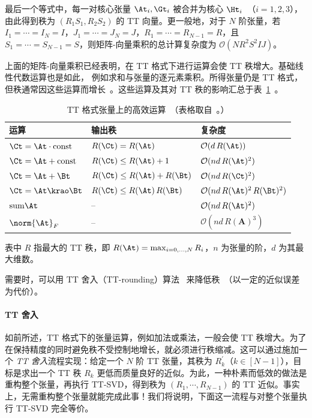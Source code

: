 最后一个等式中，每一对核心张量 $\At_i,\Gt_i$ 被合并为核心 $\Ht_i$~（$i = 1,2,3$），由此得到秩为 $(R_1 S_1, R_2 S_2)$ 的 TT 向量。更一般地，对于 $N$ 阶张量，若 $I_1 = \cdots = I_N = I$，$J_1 = \cdots = J_N = J$，$R_1 = \cdots = R_{N-1} = R$，且 $S_1 = \cdots = S_{N-1} = S$，则矩阵-向量乘积的总计算复杂度为 $\mathcal{O}(N R^2 S^2 I J)$。

上面的矩阵-向量乘积已经表明，在 TT 格式下进行运算会使 TT 秩增大。基础线性代数运算也是如此，
例如求和与张量的逐元素乘积。所得张量仍是 TT 格式，但秩通常因这些运算而增长~\citep{oseledets2010approximation}。这些运算及其对 TT 秩的影响汇总于表~\ref{tab:tt-operations}~\citep{novikov2014putting}。
\begin{table}
\centering
\begin{tabular}{lll}
\toprule
\textsc{运算} & \textsc{输出秩} & \textsc{复杂度} \\
\midrule
$\Ct = \At \cdot \text{const}$ & $R(\Ct) = R(\At)$ & $\mathcal{O}(d\,R(\At))$ \\
$\Ct = \At + \text{const}$ & $R(\Ct) \leq R(\At) + 1$ & $\mathcal{O}(nd\,R(\At)^2)$ \\
$\Ct = \At + \Bt$ & $R(\Ct) \leq R(\At) + R(\Bt)$ & $\mathcal{O}(nd\,R(\Ct)^2)$ \\
$\Ct = \At \krao \Bt$ & $R(\Ct) \leq R(\At)\,R(\Bt)$ & $\mathcal{O}(nd\,R(\At)^2\,R(\Bt)^2)$ \\
$\mathrm{sum} \At$ & -- & $\mathcal{O}(nd\,R(\At)^2)$ \\
$\norm{\At}_F$ & -- & $\mathcal{O}(nd\,R(\mathbf{A})^3)$ \\
\bottomrule
\end{tabular}
\caption{ TT 格式张量上的高效运算~（表格取自~\citep{novikov2014putting}。）}
\label{tab:tt-operations}
\end{table}
表中 $R$ 指最大的 TT 秩，即 $R(\At) = \max_{i=0,\dots,N} R_i$，$n$ 为张量的阶，$d$ 为其最大维数。

需要时，可以用 TT 舍入（TT-rounding）算法~\citep{oseledets2010approximation} 来降低秩~（以一定的近似误差为代价）。

\paragraph{TT 舍入} 如前所述，TT 格式下的张量运算，例如加法或乘法，一般会使 TT 秩增大。为了在保持精度的同时避免秩不受控制地增长，就必须进行秩缩减。这可以通过施加一个 \emph{TT 舍入}流程实现：给定一个 $N$ 阶 TT 张量，其秩为 $R^\prime_k$（$k\in[N-1]$），目标是求出一个 TT 秩 $R_k$ 更低而质量良好的近似。为此，一种朴素而低效的做法是重构整个张量，再执行 TT-SVD，得到秩为 $(R_1,\cdots,R_{N-1})$ 的 TT 近似。事实上，无需重构整个张量就能完成此事！我们将说明，下面这一流程与对整个张量执行 TT-SVD 完全等价。

